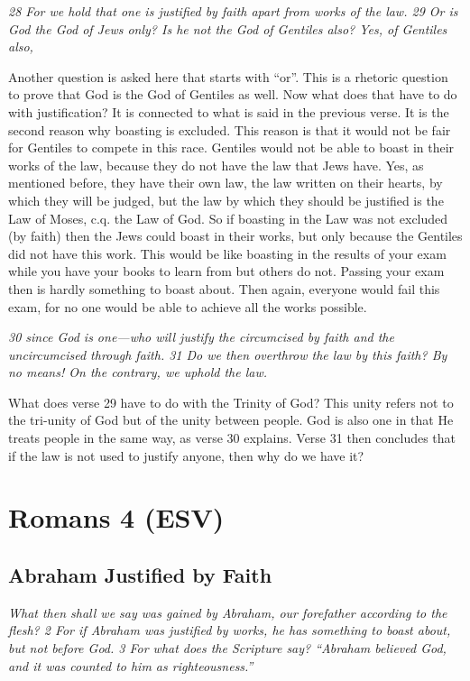 \emph{28 For we hold that one is justified by faith apart from works of
the law. 29 Or is God the God of Jews only? Is he not the God of
Gentiles also? Yes, of Gentiles also,}

Another question is asked here that starts with ``or''. This is a
rhetoric question to prove that God is the God of Gentiles as well. Now
what does that have to do with justification? It is connected to what is
said in the previous verse. It is the second reason why boasting is
excluded. This reason is that it would not be fair for Gentiles to
compete in this race. Gentiles would not be able to boast in their works
of the law, because they do not have the law that Jews have. Yes, as
mentioned before, they have their own law, the law written on their
hearts, by which they will be judged, but the law by which they should
be justified is the Law of Moses, c.q. the Law of God. So if boasting in
the Law was not excluded (by faith) then the Jews could boast in their
works, but only because the Gentiles did not have this work. This would
be like boasting in the results of your exam while you have your books
to learn from but others do not. Passing your exam then is hardly
something to boast about. Then again, everyone would fail this exam, for
no one would be able to achieve all the works possible.

\emph{30 since God is one---who will justify the circumcised by faith
and the uncircumcised through faith. 31 Do we then overthrow the law by
this faith? By no means! On the contrary, we uphold the law.}

What does verse 29 have to do with the Trinity of God? This unity refers
not to the tri-unity of God but of the unity between people. God is also
one in that He treats people in the same way, as verse 30 explains.
Verse 31 then concludes that if the law is not used to justify anyone,
then why do we have it?



\hypertarget{romans-4-esv}{%
\section{Romans 4 (ESV)}\label{romans-4-esv}}
\vspace{10.5cm}
\subsection{Abraham Justified by Faith} \emph{What then shall we say was
gained by Abraham, our forefather according to the flesh? 2 For if
Abraham was justified by works, he has something to boast about, but not
before God. 3 For what does the Scripture say? ``Abraham believed God,
and it was counted to him as righteousness.''}

